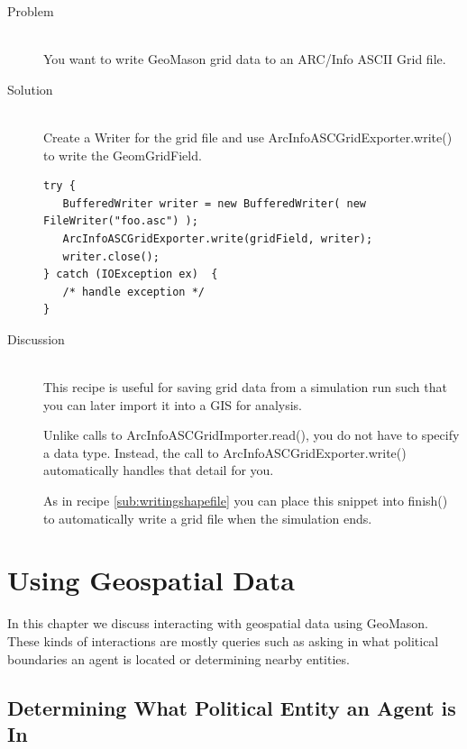 \documentclass[twoside,10pt]{book}
\newcommand\method[1]{\textsf{#1}}
\newcommand\code[1]{\textsf{#1}}
\begin{document}
\begin{description}
\item[Problem]~\\
You want to write GeoMason grid data to an ARC/Info ASCII Grid file.

\item[Solution]~\\
Create a \code{Writer} for the grid file and use \code{ArcInfoASCGridExporter.write()} to write the \code{GeomGridField}.
\begin{Verbatim}[frame=lines,framesep=5mm,commandchars=+\[\]]
try {
   BufferedWriter writer = new BufferedWriter( new FileWriter("foo.asc") );
   ArcInfoASCGridExporter.write(gridField, writer);
   writer.close();
} catch (IOException ex)  {
   /* handle exception */
}
\end{Verbatim}

\item[Discussion] ~\\
This recipe is useful for saving grid data from a simulation run such
that you can later import it into a GIS for analysis.

Unlike calls to \method{ArcInfoASCGridImporter.read()}, you do not
have to specify a data type.  Instead, the call to
\method{ArcInfoASCGridExporter.write()} automatically handles that
detail for you.

As in recipe \ref{sub:writingshapefile} you can place this snippet into
\method{finish()} to automatically write a grid file when the
simulation ends.
\end{description}




\chapter{Using Geospatial Data}
\label{ch:using}

In this chapter we discuss interacting with geospatial data using
GeoMason.  These kinds of interactions are mostly queries such as
asking in what political boundaries an agent is located or determining
nearby entities.


\section{Determining What Political Entity an Agent is In}
\label{sec:politicalentity}
\end{document}
